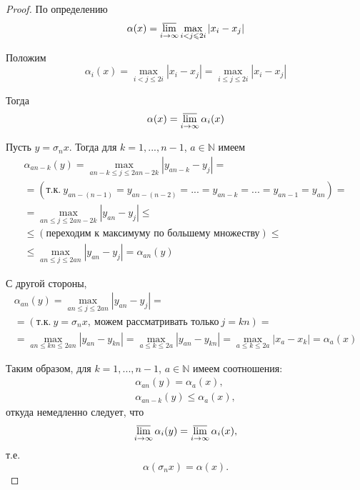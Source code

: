 \documentclass[a4paper,14pt]{article} %
\theoremstyle{plain}
\begin{document}
\begin{proof}
	По определению
	\begin{equation}
		\alpha(x) = \varlimsup_{i\to\infty} \max_{i<j\leqslant 2i} |x_i - x_j|
	\end{equation}

	Положим
	\begin{equation}
		\alpha_i(x) =
		\max_{i<j\leqslant 2i} |x_i - x_j| =
		\max_{i\leqslant j\leqslant 2i} |x_i - x_j|
	\end{equation}

	Тогда
	\begin{equation}
		\alpha(x) = \varlimsup_{i\to\infty} \alpha_i(x)
	\end{equation}

	Пусть $y = \sigma_n x$.
	Тогда для $k=1, ..., n-1$, $a\in\mathbb{N}$ имеем
	\begin{multline}
		\alpha_{an-k}(y) =
		\max_{an-k \leqslant j \leqslant 2an-2k} |y_{an-k} - y_j| =
		\\=
		(\mbox{т.к.}~y_{an-(n-1)}=y_{an-(n-2)}=...=y_{an-k}=...=y_{an-1}=y_{an})=
		\\=
		\max_{an \leqslant j \leqslant 2an-2k} |y_{an} - y_j| \leqslant
		\\ \leqslant
		(\mbox{переходим к максимуму по большему множеству}) \leqslant
		\\ \leqslant
		\max_{an \leqslant j \leqslant 2an} |y_{an} - y_j| =
		\alpha_{an}(y)
	\end{multline}

	С другой стороны,
	\begin{multline}
		\alpha_{an}(y) =
		\max_{an \leqslant j \leqslant 2an} |y_{an} - y_j| =
		\\ =
		(\mbox{т.к.}~y=\sigma_n x,~\mbox{можем рассматривать только}~j=kn)=
		\\ =
		\max_{an \leqslant kn \leqslant 2an} |y_{an} - y_{kn}| =
		\max_{a \leqslant k \leqslant 2a} |y_{an} - y_{kn}| =
		\max_{a \leqslant k \leqslant 2a} |x_a - x_k| =
		\alpha_a(x)
	\end{multline}

	Таким образом, для $k=1, ..., n-1$, $a\in\mathbb{N}$ имеем соотношения:
	\begin{gather}
		\alpha_{an}(y) = \alpha_a(x),
	\\
		\alpha_{an-k}(y) \leqslant \alpha_a(x),
	\end{gather}
	откуда немедленно следует, что
	\begin{equation}
		\varlimsup_{i\to\infty} \alpha_i(y) =
		\varlimsup_{i\to\infty} \alpha_i(x),
	\end{equation}
	т.е.
	\begin{equation}
		\alpha(\sigma_n x) = \alpha(x)
		.
	\end{equation}
\end{proof}
\end{document}
